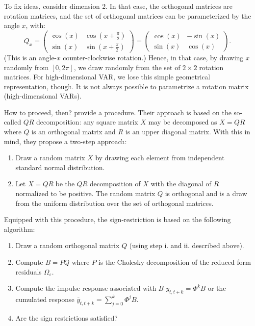 \documentclass[
  12pt,
]{book}
\providecommand{\tightlist}{%
  \setlength{\itemsep}{0pt}\setlength{\parskip}{0pt}}
\theoremstyle{definition}
\theoremstyle{definition}
\theoremstyle{definition}
\theoremstyle{definition}
\theoremstyle{remark}
\begin{document}
To fix ideas, consider dimension 2. In that case, the orthogonal matrices are rotation matrices, and the set of orthogonal matrices can be parameterized by the angle \(x\), with:
\[
Q_x=\begin{pmatrix}\cos(x)&\cos\left(x+\frac{\pi}{2}\right)\\
\sin(x)&\sin\left(x+\frac{\pi}{2}\right)\end{pmatrix}=\begin{pmatrix}\cos(x)&-\sin(x)\\
\sin(x)&\cos(x)\end{pmatrix}.
\]
(This is an angle-\(x\) counter-clockwise rotation.) Hence, in that case, by drawing \(x\) randomly from \([0,2\pi]\), we draw randomly from the set of \(2\times2\) rotation matrices. For high-dimensional VAR, we lose this simple geometrical representation, though. It is not always possible to parametrize a rotation matrix (high-dimensional VARs).

How to proceed, then? \citet{Arias_et_al_2018} provide a procedure. Their approach is based on the so-called \(QR\) decomposition: any square matrix \(X\) may be decomposed as \(X=QR\) where \(Q\) is an orthogonal matrix and \(R\) is an upper diagonal matrix. With this in mind, they propose a two-step approach:

\begin{enumerate}
\def\labelenumi{\roman{enumi}.}
\tightlist
\item
  Draw a random matrix \(X\) by drawing each element from independent standard normal distribution.
\item
  Let \(X = QR\) be the \(QR\) decomposition of \(X\) with the diagonal of \(R\) normalized to be
  positive. The random matrix \(Q\) is orthogonal and is a draw from the uniform distribution over the set of orthogonal matrices.
\end{enumerate}

Equipped with this procedure, the sign-restriction is based on the following algorithm:

\begin{enumerate}
\def\labelenumi{\arabic{enumi}.}
\tightlist
\item
  Draw a random orthogonal matrix \(Q\) (using step i. and ii. described above).
\item
  Compute \(B = PQ\) where \(P\) is the Cholesky decomposition of the reduced form residuals \(\Omega_{\varepsilon}\).
\item
  Compute the impulse response associated with \(B\) \(y_{t,t+k}=\Phi^kB\) or the cumulated response \(\bar y_{t,t+k}=\sum_{j=0}^{k}\Phi^jB\).
\item
  Are the sign restrictions satisfied?
\end{enumerate}
\end{document}
